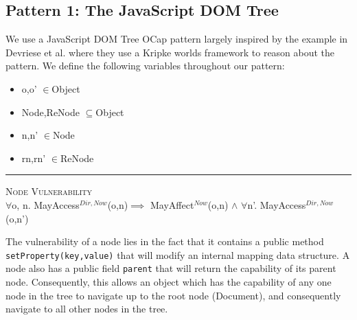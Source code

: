 \documentclass[a4paper,11pt, twoside,twocolumn]{article}
\newenvironment{logic}[1][]
{\begin{flushleft} \small }
{\end{flushleft}}
\newcommand{\loin}{$\in$}
\newcommand{\loforall}{$\forall$}
\newcommand{\loand}{$\land$}
\newcommand{\losubseteq}{$\subseteq$}
\newcommand{\loimplies}{$\implies$}
\newcommand{\ablock} {\null\qquad}
\begin{document}
\subsection{Pattern 1: The JavaScript DOM Tree}
We use a JavaScript DOM Tree OCap pattern largely inspired by the example in Devriese et al.\cite{devriese2016} where they use a Kripke worlds framework to reason about the pattern. We define the following variables throughout our pattern:
\begin{itemize}
\item o,o' \loin Object
\item Node,ReNode \losubseteq Object
\item n,n' \loin Node
\item rn,rn' \loin ReNode
\end{itemize}

\begin{logic}[NodeVul]
\hrule\null
\textsc{\normalsize *Node Vulnerability}\\
\loforall o, n. MayAccess$^{Dir,Now}$(o,n)\linebreak \ablock\ablock \loimplies \linebreak
\ablock \ablock MayAffect$^{Now}$(o,n) \loand \linebreak
\ablock \ablock \loforall n'. MayAccess$^{Dir,Now}$(o,n')
\end{logic}
The vulnerability of a node lies in the fact that it contains a public method \texttt{setProperty(key,value)} that will modify an internal mapping data structure. A node also has a public field \texttt{parent} that will return the capability of its parent node. Consequently, this allows an object which has the capability of any one node in the tree to navigate up to the root node (Document), and consequently navigate to all other nodes in the tree.\\
\end{document}
